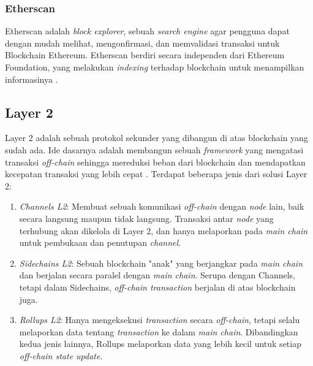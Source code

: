 \subsubsection{Etherscan}
\label{subsubsec:etherscan}

Etherscan adalah \textit{block explorer}, sebuah \textit{search engine} agar pengguna dapat dengan mudah melihat, mengonfirmasi, dan memvalidasi transaksi untuk Blockchain Ethereum. Etherscan berdiri secara independen dari Ethereum Foundation, yang melakukan \textit{indexing} terhadap blockchain untuk menampilkan informasinya \parencite{etherscan2024}.

\subsection{Layer 2}
\label{subsec:layer-2}

Layer 2 adalah sebuah protokol sekunder yang dibangun di atas blockchain yang sudah ada. Ide dasarnya adalah membangun sebuah \textit{framework} yang mengatasi transaksi \textit{off-chain} sehingga mereduksi beban dari blockchain dan mendapatkan kecepatan transaksi yang lebih cepat \parencite{sguanci2021layer}. Terdapat beberapa jenis dari solusi Layer 2:

\begin{enumerate}
	\item \textit{Channels L2}: Membuat sebuah komunikasi \textit{off-chain} dengan \textit{node} lain, baik secara langsung maupun tidak langsung. Transaksi antar \textit{node} yang terhubung akan dikelola di Layer 2, dan hanya melaporkan pada \textit{main chain} untuk pembukaan dan penutupan \textit{channel}.
	\item \textit{Sidechains L2}: Sebuah blockchain "anak" yang berjangkar pada \textit{main chain} dan berjalan secara paralel dengan \textit{main chain}. Serupa dengan Channels, tetapi dalam Sidechains, \textit{off-chain transaction} berjalan di atas blockchain juga.
	\item \textit{Rollups L2}: Hanya mengeksekusi \textit{transaction} secara \textit{off-chain}, tetapi selalu melaporkan data tentang \textit{transaction} ke dalam \textit{main chain}. Dibandingkan kedua jenis lainnya, Rollups melaporkan data yang lebih kecil untuk setiap \textit{off-chain state update}.
\end{enumerate}
